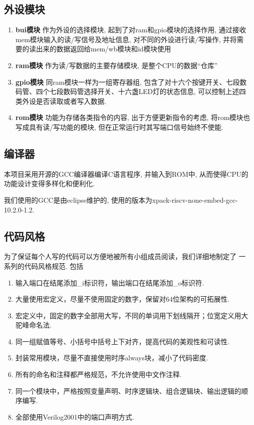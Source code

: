 \documentclass[lang=cn,11pt,a4paper,chinesefont=founder]{elegantpaper}
\begin{document}
\subsection{外设模块}
\begin{enumerate}
    \item \textbf{bui模块}
          作为外设的选择模块, 起到了对ram和gpio模块的选择作用, 通过接收mem模块输入的读/写信号及地址信息, 对不同的外设进行读/写操作, 并将需要的读出来的数据返回给mem/wb模块和id模块使用
    \item \textbf{ram模块}
          作为读/写数据的主要存储模块, 是整个CPU的数据“仓库”
    \item \textbf{gpio模块} 同ram模块一样为一组寄存器组, 包含了对十六个按键开关、七段数码管、四个七段数码管选择开关、十六盏LED灯的状态信息, 可以控制上述四类外设是否读取或者写入数据. 
    \item \textbf{rom模块}
          功能为存储各类指令的内容, 出于方便更新指令的考虑, 将rom模块也写成具有读/写功能的模块, 但在正常运行时其写端口信号始终不使能. 
\end{enumerate}
\subsection{编译器}
本项目采用开源的GCC编译器编译C语言程序, 并输入到ROM中, 从而使得CPU的功能设计变得多样化和便利化. 

我们使用的GCC是由eclipse维护的, 使用的版本为xpack-riscv-none-embed-gcc-10.2.0-1.2. 

\subsection{代码风格}

为了保证每个人写的代码可以方便地被所有小组成员阅读，我们详细地制定了
一系列的代码风格规范. 包括
\begin{enumerate}
\item 输入端口在结尾添加\_i标识符，输出端口在结尾添加\_o标识符.
\item 大量使用宏定义，尽量不使用固定的数字，保留对64位架构的可拓展性.
\item 宏定义中，固定的数字全部用大写，不同的单词用下划线隔开；位宽定义用大驼峰命名法.
\item 同一组赋值等号、小括号中括号上下对齐，提高代码的美观性和可读性.
\item 封装常用模块，尽量不直接使用时序always块，减小了代码密度.
\item 所有的命名和注释都严格规范，不允许使用中文作注释.
\item 同一个模块中，严格按照变量声明、时序逻辑块、组合逻辑块、输出逻辑的顺序编写.
\item 全部使用Verilog2001中的端口声明方式. 
\end{enumerate}
\end{document}
